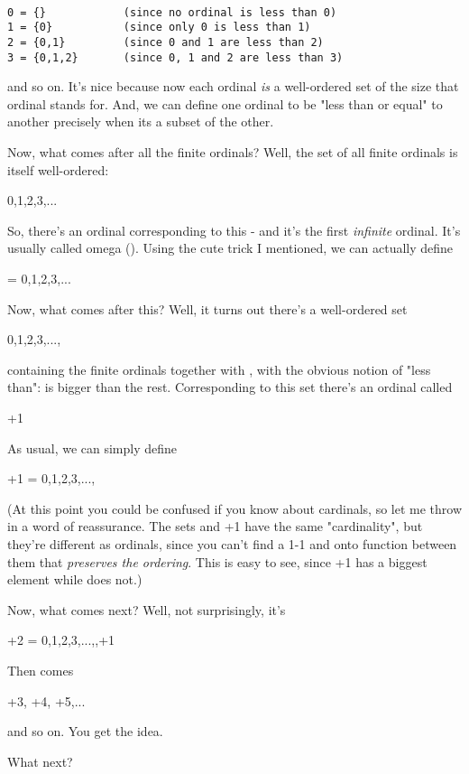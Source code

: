 \begin{verbatim}

0 = {}            (since no ordinal is less than 0) 
1 = {0}           (since only 0 is less than 1)  
2 = {0,1}         (since 0 and 1 are less than 2)
3 = {0,1,2}       (since 0, 1 and 2 are less than 3)
\end{verbatim}
    
and so on.   It's nice because now each ordinal \emph{is} a
well-ordered set of the size that ordinal stands for.
And, we can define one ordinal to be "less than or equal" to
another precisely when its a subset of the other.

Now, what comes after all the finite ordinals?  Well,
the set of all finite ordinals is itself well-ordered:

{0,1,2,3,...}

So, there's an ordinal corresponding to this - and it's the first
\emph{infinite} ordinal.  It's usually called omega (\omega ).
Using the cute trick I mentioned, we can actually define

\omega  = {0,1,2,3,...}

Now, what comes after this?  Well, it turns out there's a
well-ordered set

{0,1,2,3,...,\omega }

containing the finite ordinals together with \omega , with the
obvious notion of "less than": \omega  is bigger than the rest.  
Corresponding to this set there's an ordinal called

\omega +1

As usual, we can simply define

\omega +1 = {0,1,2,3,...,\omega }

(At this point you could be confused if you know about cardinals,
so let me throw in a word of reassurance.  The sets \omega  and
\omega +1 have the same "cardinality", but they're different as 
ordinals, since you can't find a 1-1 and onto function between 
them that \emph{preserves the ordering}.  This is easy to see, since
\omega +1 has a biggest element while \omega  does not.)

Now, what comes next?  Well, not surprisingly, it's

\omega +2 = {0,1,2,3,...,\omega ,\omega +1}
 
Then comes 

\omega +3, \omega +4, \omega +5,...

and so on.  You get the idea.

What next?  

